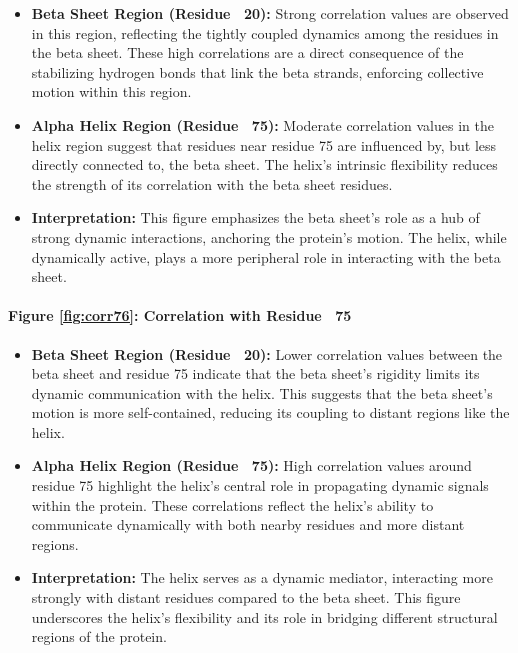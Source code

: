 \documentclass[English, Lau, oneside]{sapthesis}
\begin{document}
\begin{itemize}
    \item \textbf{Beta Sheet Region (Residue ~20):} Strong correlation values are observed in this region, reflecting the tightly coupled dynamics among the residues in the beta sheet. These high correlations are a direct consequence of the stabilizing hydrogen bonds that link the beta strands, enforcing collective motion within this region.
    \item \textbf{Alpha Helix Region (Residue ~75):} Moderate correlation values in the helix region suggest that residues near residue 75 are influenced by, but less directly connected to, the beta sheet. The helix's intrinsic flexibility reduces the strength of its correlation with the beta sheet residues.
    \item \textbf{Interpretation:} This figure emphasizes the beta sheet's role as a hub of strong dynamic interactions, anchoring the protein’s motion. The helix, while dynamically active, plays a more peripheral role in interacting with the beta sheet.
\end{itemize}

\paragraph{Figure \ref{fig:corr76}: Correlation with Residue ~75}
\begin{itemize}
    \item \textbf{Beta Sheet Region (Residue ~20):} Lower correlation values between the beta sheet and residue 75 indicate that the beta sheet's rigidity limits its dynamic communication with the helix. This suggests that the beta sheet’s motion is more self-contained, reducing its coupling to distant regions like the helix.
    \item \textbf{Alpha Helix Region (Residue ~75):} High correlation values around residue 75 highlight the helix's central role in propagating dynamic signals within the protein. These correlations reflect the helix’s ability to communicate dynamically with both nearby residues and more distant regions.
    \item \textbf{Interpretation:} The helix serves as a dynamic mediator, interacting more strongly with distant residues compared to the beta sheet. This figure underscores the helix’s flexibility and its role in bridging different structural regions of the protein.
\end{itemize}

\newpage
\newpage
\end{document}
